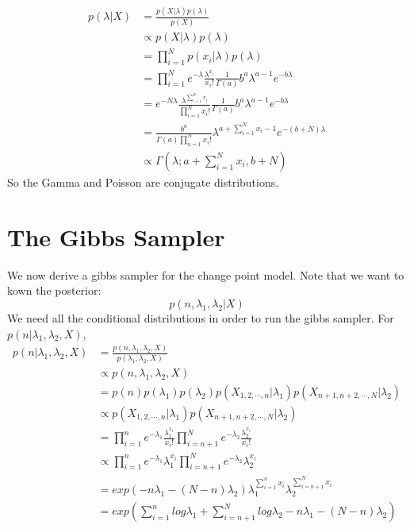 \documentclass[12pt]{article}
\begin{document}
\begin{equation}
\begin{split}
p(\lambda|X) & = \frac{p(X|\lambda)p(\lambda)}{p(X)} \\
			 & \propto p(X|\lambda)p(\lambda) \\
			 & = \prod_{i=1}^N p(x_i|\lambda) p(\lambda) \\ 
			 & = \prod_{i=1}^N e^{-\lambda} \frac{\lambda^{x_i}}{x_i!} \frac{1}{\Gamma(a)}b^a\lambda^{a-1}e^{-b\lambda} \\
			 & = e^{-N\lambda}\frac{\lambda^{\sum_{i=1}^Nx_i}}{\prod_{i=1}^{N}x_i!}\frac{1}{\Gamma(a)}b^a\lambda^{a-1}e^{-b\lambda} \\
			 & = \frac{b^a}{\Gamma(a)\prod_{n=1}^Nx_i!}\lambda^{a+\sum_{i=1}^Nx_i-1}e^{-(b+N)\lambda} \\
			 & \propto \Gamma(\lambda;a+\sum_{i=1}^Nx_i,b+N)
\end{split}
\end{equation}
So the Gamma and Poisson are conjugate distributions.

\section{The Gibbs Sampler}
We now derive a gibbs sampler for the change point model. Note that we want to kown the posterior:
$$ p(n,\lambda_1,\lambda_2|X) $$
We need all the conditional distributions in order to run the gibbs sampler. For $p(n|\lambda_1,\lambda_2,X)$,
\begin{equation}\label{formula:npost} 
\begin{split}
p(n|\lambda_1,\lambda_2,X) & = \frac{p(n,\lambda_1,\lambda_2,X)}{p(\lambda_1,\lambda_2,X)} \\
						   & \propto p(n,\lambda_1,\lambda_2,X) \\
						   & = p(n) p(\lambda_1) p(\lambda_2) p(X_{1,2,\cdots,n}|\lambda_1) p(X_{n+1,n+2,\cdots,N}|\lambda_2) \\
						   & \propto p(X_{1,2,\cdots,n}|\lambda_1) p(X_{n+1,n+2,\cdots,N}|\lambda_2) \\ 
						   & = \prod_{i=1}^n e^{-\lambda_1}\frac{\lambda_1^{x_i}}{x_i!} \prod_{i=n+1}^N e^{-\lambda_2}\frac{\lambda_2^{x_i}}{x_i!} \\
						   & \propto \prod_{i=1}^n e^{-\lambda_1}\lambda_1^{x_i} \prod_{i=n+1}^N e^{-\lambda_2} \lambda_2^{x_i} \\
						   & = exp(-n\lambda_1 - (N-n)\lambda_2)\lambda_1^{\sum_{i=1}^nx_i}\lambda_2^{\sum_{i=n+1}^Nx_i} \\
						   & = exp(\sum_{i=1}^nlog\lambda_1 + \sum_{i=n+1}^Nlog\lambda_2 - n\lambda_1 - (N-n)\lambda_2) 
\end{split}
\end{equation}
\end{document}
